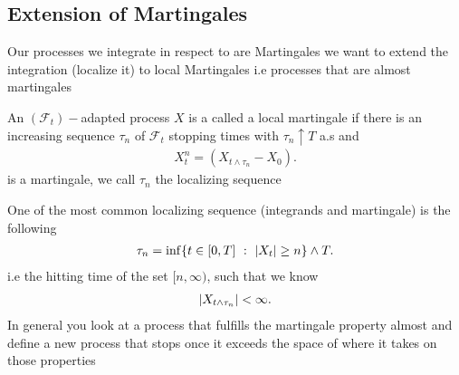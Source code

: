 \subsection{Extension of Martingales}
Our processes we integrate in respect to are Martingales we want to extend the integration (localize it) to local Martingales i.e 
processes that are almost martingales
\begin{definition}
 An $(\mathcal{F}_t)-$adapted process $X$  is a called a local martingale if there is an increasing sequence $\tau_n$ of $\mathcal{F}_t$ stopping times with $\tau_n \uparrow T$ a.s and 
 \begin{align*}
   X^{n}_t = (X_{t \land \tau_n} - X_0) 
 .\end{align*}
 is a martingale, we call $\tau_n$ the localizing sequence
\end{definition}
\begin{example}
One of the most common localizing sequence (integrands and martingale)  is the following 
\begin{align*}
  \tau_n = \inf \{t \in  [0,T]  \ : \ \lvert X_t\rvert \ge  n\}   \land T
.\end{align*}
i.e the hitting time of the set $[n ,\infty)$, such that we know 
\begin{align*}
  \lvert X_{t \land \tau_n}\rvert < \infty
.\end{align*}
In general you look at a process that fulfills the martingale property almost and define a new process that stops once it exceeds the space of where it takes on those properties
\end{example}
